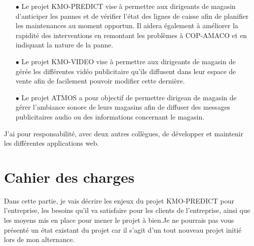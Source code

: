 \documentclass[12pt]{article}
\begin{document}
\begin{itemize}
    \item [$\bullet$] Le projet KMO-PREDICT vise à permettre aux dirigeants de magasin d'anticiper les pannes et de vérifier l'état des lignes de caisse afin de planifier les maintenances au moment opportun. Il aidera également à améliorer la rapidité des interventions  en remontant les problèmes à COP-AMACO et en indiquant la nature de la panne.
    \item[$\bullet$] Le projet KMO-VIDEO vise à permettre aux dirigeants de magasin de gérée les différentes vidéo publicitaire qu'ils diffusent dans leur espace de vente afin de facilement pouvoir modifier cette dernière. 
    \item[$\bullet$] Le projet ATMOS a pour objectif de permettre dirigean de magasin  de gérer l'ambiance sonore de leurs magasins afin de diffuser des messages publicitaires audio ou des informations concernant le magasin.  
\end{itemize}

\newline
\justify
\text  J'ai  pour responsabilité, avec deux autres collègues, de développer et maintenir les différentes applications web.


\section{Cahier des charges }
\text Dans cette partie, je vais décrire les enjeux du projet KMO-PREDICT pour l'entreprise, les besoins qu'il va satisfaire pour les clients de l'entreprise, ainsi que les moyens mis en place pour mener le projet à bien.Je ne pourrais pas vous présenté un état existant du projet car il s'agit d'un tout nouveau projet initié lors de mon alternance.  
\end{document}
